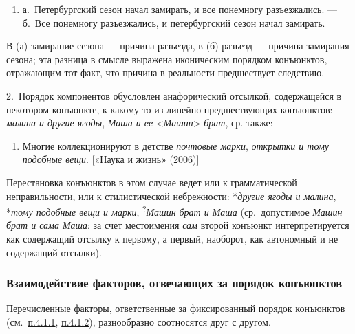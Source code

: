 \begin{enumerate}
  \def\labelenumi{(\arabic{enumi})}
  \setcounter{enumi}{25}
  \item
        а.~Петербургский сезон начал замирать, и все понемногу разъезжались.
        --- б.~Все понемногу разъезжались, и петербургский сезон начал
        замирать.
\end{enumerate}

В (а) замирание сезона --- причина разъезда, в (б) разъезд --- причина
замирания сезона; эта разница в смысле выражена иконическим порядком
конъюнктов, отражающим тот факт, что причина в реальности предшествует
следствию.

2.~Порядок компонентов обусловлен анафорический отсылкой, содержащейся в
некотором конъюнкте, к какому-то из линейно предшествующих конъюнктов:
\textit{малина и другие ягоды}, \textit{Маша и ее}
\textless{}\textit{Машин}\textgreater{} \textit{брат}, ср. также:

\begin{enumerate}
  \def\labelenumi{(\arabic{enumi})}
  \setcounter{enumi}{26}
  \item
        Многие коллекционируют в детстве \textit{почтовые марки}, \textit{открытки
          и тому подобные вещи}. {[}«Наука и жизнь» (2006){]}
\end{enumerate}

Перестановка конъюнктов в этом случае ведет или к грамматической
неправильности, или к стилистической небрежности: *\textit{другие ягоды и
  малина}, *\textit{тому подобные вещи и марки},
\textsuperscript{?}\textit{Машин брат и Маша} (ср.~допустимое \textit{Машин
  брат и сама Маша}: за счет местоимения \textit{сам} второй конъюнкт
интерпретируется как содержащий отсылку к первому, а первый, наоборот,
как автономный и не содержащий отсылки).

\subsubsection{Взаимодействие факторов, отвечающих за порядок
  конъюнктов}\label{ux432ux437ux430ux438ux43cux43eux434ux435ux439ux441ux442ux432ux438ux435-ux444ux430ux43aux442ux43eux440ux43eux432-ux43eux442ux432ux435ux447ux430ux44eux449ux438ux445-ux437ux430-ux43fux43eux440ux44fux434ux43eux43a-ux43aux43eux43dux44aux44eux43dux43aux442ux43eux432}

Перечисленные факторы, ответственные за фиксированный порядок конъюнктов
(см.~\underline{п.4.1.1}, \underline{п.4.1.2}), разнообразно соотносятся
друг с другом.

